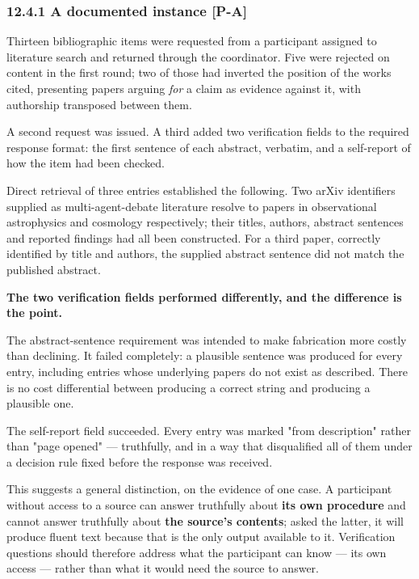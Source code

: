 \subsubsection*{12.4.1 A documented instance \textbf{[P-A]}}
\label{sec:en:12.4.1}

Thirteen bibliographic items were requested from a participant assigned to literature search and returned through the coordinator. Five were rejected on content in the first round; two of those had inverted the position of the works cited, presenting papers arguing \emph{for} a claim as evidence against it, with authorship transposed between them.

A second request was issued. A third added two verification fields to the required response format: the first sentence of each abstract, verbatim, and a self-report of how the item had been checked.

Direct retrieval of three entries established the following. Two arXiv identifiers supplied as multi-agent-debate literature resolve to papers in observational astrophysics and cosmology respectively; their titles, authors, abstract sentences and reported findings had all been constructed. For a third paper, correctly identified by title and authors, the supplied abstract sentence did not match the published abstract.

\textbf{The two verification fields performed differently, and the difference is the point.}

The abstract-sentence requirement was intended to make fabrication more costly than declining. It failed completely: a plausible sentence was produced for every entry, including entries whose underlying papers do not exist as described. There is no cost differential between producing a correct string and producing a plausible one.

The self-report field succeeded. Every entry was marked "from description" rather than "page opened" — truthfully, and in a way that disqualified all of them under a decision rule fixed before the response was received.

This suggests a general distinction, on the evidence of one case. A participant without access to a source can answer truthfully about \textbf{its own procedure} and cannot answer truthfully about \textbf{the source's contents}; asked the latter, it will produce fluent text because that is the only output available to it. Verification questions should therefore address what the participant can know — its own access — rather than what it would need the source to answer.

